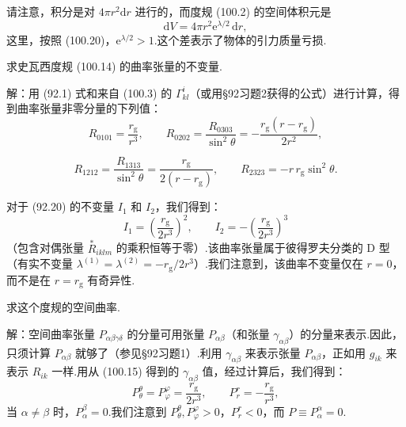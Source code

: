 请注意，积分是对 $4\pi r^{2}\mathrm{d}r$ 进行的，而度规 (100.2) 的空间体积元是
\begin{equation*}
  \mathrm{d}V=4\pi r^{2}\mathrm{e}^{\lambda/2}\,\mathrm{d}r,
\end{equation*}
这里，按照 (100.20)，$\mathrm{e}^{\lambda/2}>1$.这个差表示了物体的引力质量亏损.

\begin{xiti}

\quad 求史瓦西度规 (100.14) 的曲率张量的不变量.

解：用 (92.1) 式和来自 (100.3) 的 $\Gamma_{kl}^i$（或用§92习题2获得的公式）进行计算，得到曲率张量非零分量的下列值：
\begin{equation*}
  R_{0101}=\frac{r_{\mathrm{g}}}{r^{3}},\qquad
  R_{0202}=\frac{R_{0303}}{\sin^{2}\theta}
  =-\frac{r_{\mathrm{g}}(r-r_{\mathrm{g}})}{2r^{2}},
\end{equation*}

\begin{equation*}
  R_{1212}=\frac{R_{1313}}{\sin^{2}\theta}
  =\frac{r_{\mathrm{g}}}{2(r-r_{\mathrm{g}})},\qquad
  R_{2323}=-r\,r_{\mathrm{g}}\sin^{2}\theta.
\end{equation*}

对于 (92.20) 的不变量 $I_1$ 和 $I_2$，我们得到：
\begin{equation*}
  I_1=\left(\frac{r_{\mathrm{g}}}{2r^{3}}\right)^{2},\qquad
  I_2=-\left(\frac{r_{\mathrm{g}}}{2r^{3}}\right)^{3}
\end{equation*}
（包含对偶张量 $\stackrel{*}{R}_{iklm}$ 的乘积恒等于零）.该曲率张量属于彼得罗夫分类的 D 型（有实不变量 $\lambda^{(1)}=\lambda^{(2)}=-r_{\mathrm{g}}/2r^{3}$）.我们注意到，该曲率不变量仅在 $r=0$，而不是在 $r=r_{\mathrm{g}}$ 有奇异性.

\quad 求这个度规的空间曲率.

解：空间曲率张量 $P_{\alpha\beta\gamma\delta}$ 的分量可用张量 $P_{\alpha\beta}$（和张量 $\gamma_{\alpha\beta}$）的分量来表示.因此，只须计算 $P_{\alpha\beta}$ 就够了（参见§92习题1）.利用 $\gamma_{\alpha\beta}$ 来表示张量 $P_{\alpha\beta}$，正如用 $g_{ik}$ 来表示 $R_{ik}$ 一样.用从 (100.15) 得到的 $\gamma_{\alpha\beta}$ 值，经过计算后，我们得到：
\begin{equation*}
  P_{\theta}^{\theta}=P_{\varphi}^{\varphi}
  =\frac{r_{\mathrm{g}}}{2r^{3}},\qquad
  P_{r}^{r}=-\frac{r_{\mathrm{g}}}{r^{3}},
\end{equation*}
当 $\alpha\neq\beta$ 时，$P_{\alpha}^{\beta}=0$.我们注意到 $P_{\theta}^{\theta},P_{\varphi}^{\varphi}>0$，$P_r^r<0$，而 $P\equiv P_{\alpha}^{\alpha}=0$.


\end{xiti}
